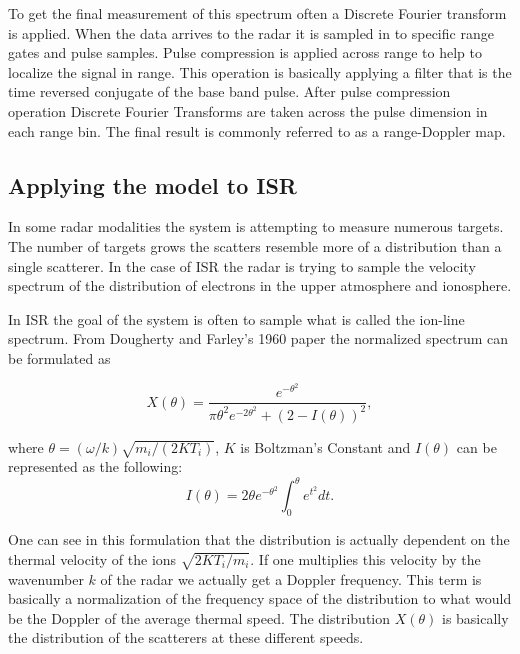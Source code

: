 To get the final measurement of this spectrum often a Discrete Fourier transform is applied.  When the data arrives to the radar it is sampled in to specific range gates and pulse samples.  Pulse compression is applied across range to help to localize the signal in range.  This operation is basically applying a filter that is the time reversed conjugate of the base band pulse.  After pulse compression operation Discrete Fourier Transforms are taken across the pulse dimension in each range bin.   The final result is commonly referred to as a range-Doppler map.


\subsection{Applying the model to ISR}
In some radar modalities the system is attempting to measure numerous targets.  The number of targets grows the scatters resemble more of a distribution than a single scatterer.  In the case of ISR the radar is trying to sample the velocity spectrum of the distribution of electrons in the upper atmosphere and ionosphere.  

In ISR the goal of the system is often to sample what is called the ion-line spectrum.  From Dougherty and Farley's 1960 paper \cite{dougherty:farley1960} the normalized spectrum can be formulated as 

\begin{equation}
\label{ionline}
X(\theta) = \frac{e^{-\theta^2}}{\pi \theta^2 e^{-2\theta^2}+(2-I(\theta))^2},
\end{equation}

\noindent where $\theta=(\omega/k)\sqrt{m_i/(2KT_i)}$, $K$ is Boltzman's Constant and $I(\theta)$ can be represented as the following:
\begin{equation}
\label{Ifunc}
I(\theta) = 2\theta e^{-\theta^2}\int_0^\theta e^{t^2}dt.
\end{equation}



One can see in this formulation that the distribution is actually dependent on the thermal velocity of the ions $\sqrt{2KT_i/m_i}$.  If one multiplies this velocity by the wavenumber $k$ of the radar we actually get a Doppler frequency.  This term is basically a normalization of the frequency space of the distribution to what would be the Doppler of the average thermal speed.  The distribution $X(\theta)$ is basically the distribution of the scatterers at these different speeds.

